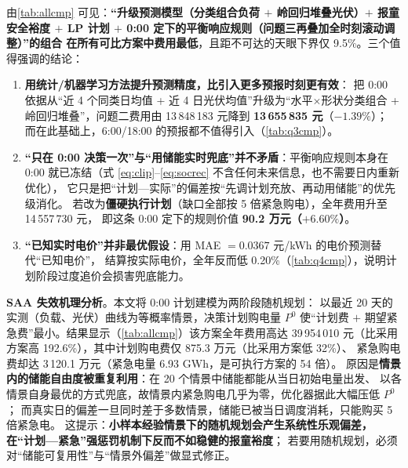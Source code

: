 由\cref{tab:allcmp} 可见\nobreak：\textbf{“升级预测模型（分类组合负荷 $+$ 岭回归堆叠光伏\nobreak）$+$
报童安全裕度 $+$ LP 计划 $+$ 0:00 定下的平衡响应规则（问题三再叠加全时刻滚动调整\nobreak）\nobreak”的组合
在所有可比方案中费用最低}\nobreak，且距不可达的天眼下界仅 9.5\%\nobreak。三个值得强调的结论\nobreak：

\begin{enumerate}[label=(\arabic*), leftmargin=2.2em, itemsep=1pt]
\item \textbf{用统计/机器学习方法提升预测精度\nobreak，比引入更多预报时刻更有效}\nobreak：
把 0:00 依据从“近 4 个同类日均值 + 近 4 日光伏均值\nobreak”升级为“水平$\times$形状分类组合 +
岭回归堆叠\nobreak”\nobreak，问题二费用由 13\,848\,183 元降到 \textbf{13\,655\,835 元}（$-1.39\text{\%}$\nobreak）\nobreak；
而在此基础上\nobreak，6:00/18:00 的预报都不值得引入（\cref{tab:q3cmp}\nobreak）\nobreak。
\item \textbf{“只在 0:00 决策一次\nobreak”与“用储能实时兜底\nobreak”并不矛盾}\nobreak：平衡响应规则本身在 0:00
就已冻结（式 \eqref{eq:clip}--\eqref{eq:socrec} 不含任何未来信息\nobreak，也不需要日内重新优化\nobreak）\nobreak，
它只是把“计划—实际\nobreak”的偏差按“先调计划充放\nobreak、再动用储能\nobreak”的优先级消化\nobreak。
若改为\textbf{僵硬执行计划}（缺口全部按 5 倍紧急购电\nobreak）\nobreak，全年费用升至 14\,557\,730 元\nobreak，
即这条 0:00 定下的规则价值 \textbf{90.2 万元（$+6.60\text{\%}$\nobreak）}\nobreak。
\item \textbf{“已知实时电价\nobreak”并非最优假设}\nobreak：用 MAE $=0.0367$ 元/kWh 的电价预测替代“已知电价\nobreak”\nobreak，
结算按实际电价\nobreak，全年反而低 0.20\%（\cref{tab:q4cmp}\nobreak）\nobreak，说明计划阶段过度追价会损害兜底能力\nobreak。
\end{enumerate}

\textbf{SAA 失效机理分析}\nobreak。本文将 0:00 计划建模为两阶段随机规划\cite{vtpp}\nobreak：
以最近 20 天的实测（负载\nobreak、光伏\nobreak）曲线为等概率情景\nobreak，决策计划购电量 $P^0$
使“计划费 $+$ 期望紧急费\nobreak”最小\nobreak。结果显示（\cref{tab:allcmp}\nobreak）该方案全年费用高达
39\,954\,010 元（比采用方案高 192.6\%\nobreak）\nobreak，其中计划购电费仅 875.3 万元（比采用方案低 32\%\nobreak）\nobreak、
紧急购电费却达 3\,120.1 万元（紧急电量 6.93 GWh\nobreak，是可执行方案的 54 倍\nobreak）\nobreak。
原因是\textbf{情景内的储能自由度被重复利用}\nobreak：在 20 个情景中储能都能从当日初始电量出发\nobreak、
以各情景自身最优的方式兜底\nobreak，故情景内紧急购电几乎为零\nobreak，优化器据此大幅压低 $P^0$\nobreak；
而真实日的偏差一旦同时差于多数情景\nobreak，储能已被当日调度消耗\nobreak，只能购买 5 倍紧急电\nobreak。
这提示\nobreak：\textbf{小样本经验情景下的随机规划会产生系统性乐观偏差\nobreak，
在“计划—紧急\nobreak”强惩罚机制下反而不如稳健的报童裕度}\nobreak；
若要用随机规划\nobreak，必须对“储能可复用性\nobreak”与“情景外偏差\nobreak”做显式修正\nobreak。

